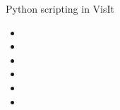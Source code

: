 \begin{frame}{Python scripting in VisIt}{}
  \begin{itemize}
  \item 
  \item 
  \item 
  \item 
  \item 
  \item 
  \end{itemize}
\end{frame}

